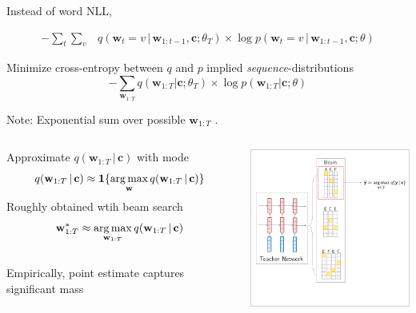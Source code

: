 \documentclass{beamer}
\newcommand{\air}{\vspace{0.25cm}}
\newcommand{\given}{\,|\,}
\newcommand{\wvec}{\mathbf{w}}
\newcommand{\cvec}{\mathbf{c}}
\def\argmax{\operatornamewithlimits{arg\,max}}
\def\argmax{\operatornamewithlimits{arg\,max}}
\begin{document}

\begin{frame}
\centerline{}
\air 
\air
\air  

Instead of word NLL, 

\begin{align*}
-\sum_t \sum_v &q(\wvec_t=v \given \wvec_{1: t-1}, \cvec ; \theta_T)\times  \log p(\wvec_t =v \given \wvec_{1: t-1}, \cvec ; \theta)
\end{align*}
 

Minimize cross-entropy between $q$ and $p$ implied \emph{sequence}-distributions 
\[
 -\sum_{\wvec_{1:T}} q(\wvec_{1:T} | \cvec; \theta_T) \times \log p(\wvec_{1:T} | \cvec ; \theta)
\]
\air

Note: Exponential sum over possible $\wvec_{1:T}$ . \\ 
\air
\air

\end{frame}

\begin{frame}
\centerline{}
\air 
\air

\begin{columns}
\begin{column}{6cm}
Approximate $q(\wvec_{1:T} \given \cvec )$ with mode
$$q(\wvec_{1:T} \given \cvec ) \approx \mathbf{1}\{\argmax_{\wvec} q(\wvec_{1:T} \given \cvec )\}$$
\air
Roughly obtained wtih  beam search 
$$ \wvec^*_{1:T} \approx  \argmax_{\wvec_{1:T}} q(\wvec_{1:T} \given \cvec ) $$
\\
Empirically, point estimate captures 
significant mass

\end{column}
\begin{column}{6cm}
\includegraphics[width=6cm]{seq-kd-1}
\end{column}
\end{columns}
\end{frame}
\end{document}
